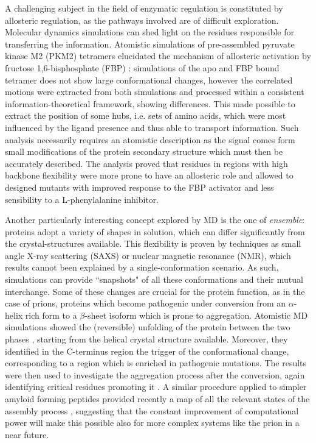 A challenging subject in the field of enzymatic regulation is constituted by allosteric regulation, as the pathways involved are of difficult exploration. Molecular dynamics simulations can shed light on the residues responsible for transferring the information.
%
Atomistic simulations of pre-assembled pyruvate kinase M2 (PKM2) tetramers elucidated the mechanism of allosteric activation by fructose 1,6-bisphosphate (FBP) \cite{Macpherson2019}: simulations of the apo and FBP bound tetramer does not show large conformational changes, however the correlated motions were extracted from both simulations and processed within a consistent information-theoretical framework, showing differences. This made possible to extract the position of some hubs, i.e. sets of amino acids, which were most influenced by the ligand presence and thus able to transport information. Such analysis necessarily requires an atomistic description as the signal comes form small modifications of the protein secondary structure which must then be accurately described.
%
The analysis proved that residues in regions with high backbone flexibility were more prone to have an allosteric role and allowed to designed mutants with improved response to the FBP activator and less sensibility to a L-phenylalanine inhibitor. 

Another particularly interesting concept explored by MD is the one of \emph{ensemble}: proteins adopt a variety of shapes in solution, which can differ significantly from the crystal-structures available. This flexibility is proven by techniques as small angle X-ray scattering (SAXS) or nuclear magnetic resonance (NMR), which results cannot been explained by a single-conformation scenario. As such, simulations can provide ``snapshots" of all these conformations and their mutual interchange.
%
Some of these changes are crucial for the protein function, as in the case of prions, proteins which become pathogenic under conversion from an $\alpha$-helix rich form to a $\beta$-sheet isoform which is prone to aggregation. Atomistic MD simulations showed the (reversible) unfolding of the protein between the two phases \cite{Chakroun2013}, starting from the helical crystal structure available. Moreover, they identified in the C-terminus region the trigger of the conformational change, corresponding to a region which is enriched in pathogenic mutations. The results were then used to investigate the aggregation process after the conversion, again identifying critical residues promoting it \cite{Collu2018}.
%
A similar procedure applied to simpler amyloid forming peptides provided recently a map of all the relevant states of the assembly process \cite{Sengupta2019}, suggesting that the constant improvement of computational power will make this possible also for more complex systems like the prion in a near future.



